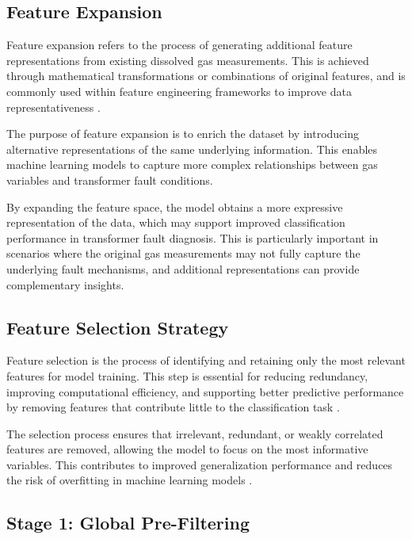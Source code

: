 \subsection{Feature Expansion}

Feature expansion refers to the process of generating additional feature representations from existing dissolved gas measurements. This is achieved through mathematical transformations or combinations of original features, and is commonly used within feature engineering frameworks to improve data representativeness \parencite{Wilfling2023FeatureEngineering}.

The purpose of feature expansion is to enrich the dataset by introducing alternative representations of the same underlying information. This enables machine learning models to capture more complex relationships between gas variables and transformer fault conditions.

By expanding the feature space, the model obtains a more expressive representation of the data, which may support improved classification performance in transformer fault diagnosis. This is particularly important in scenarios where the original gas measurements may not fully capture the underlying fault mechanisms, and additional representations can provide complementary insights.

\subsection{Feature Selection Strategy}

Feature selection is the process of identifying and retaining only the most relevant features for model training. This step is essential for reducing redundancy, improving computational efficiency, and supporting better predictive performance by removing features that contribute little to the classification task \parencite{Guyon2003FeatureSelection}.

The selection process ensures that irrelevant, redundant, or weakly correlated features are removed, allowing the model to focus on the most informative variables. This contributes to improved generalization performance and reduces the risk of overfitting in machine learning models \parencite{Guyon2003FeatureSelection}.

\subsection{Stage 1: Global Pre-Filtering}

